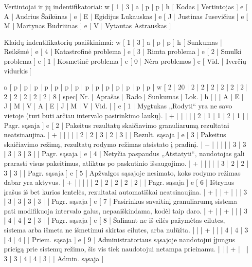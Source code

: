 Vertintojai ir jų indentifikatoriai:
\xtableu
{
  w [ 1 | 3 ]
  a [ p | p ]
  h [ Kodas | Vertintojas ]
  e [ A | Audrius Šaikūnas ]
  e [ E | Egidijus Lukauskas ]
  e [ J | Justinas Jusevičius ]
  e [ M | Martynas Budriūnas ]
  e [ V | Vytautas Astrauskas ]
}

Klaidų indentifikatorių paaiškinimai:
\xtableu
{
  w [ 1 | 3 ]
  a [ p | p ]
  h [ Sunkumas | Reikšmė ]
  e [ 4 | Katastrofinė problema ]
  e [ 3 | Rimta problema ]
  e [ 2 | Smulki problema ]
  e [ 1 | Kosmetinė problema ]
  e [ 0 | Nėra problemos ]
  e [ Vid. | Įverčių vidurkis ]
}

\xtableu
{
  a [ p   | p       | p | p | p | p | p | p | p | p | p | p | p    | p    ]
  w [ 2   | 20      | 2 | 2 | 2 | 2 | 2 | 2 | 2 | 2 | 2 | 2 | 2    | 8    ]
spec[ Nr. | Aprašas | Rado              | Sunkumas                 | Lok. ]
  h [     |         | A | E | J | M | V | A | E | J | M | V | Vid. |      ]
  e [ 1   | Mygtukas „Rodyti“ yra ne savo vietoje (turi būti arčiau intervalo
  pasirinkimo laukų).
                    | + |   |   |   |   | 2 | 1 | 1 | 2 | 1 |      | Pagr. sąsaja ]
  e [ 2   | Pakeitus rezultatų skaičiavimo granuliarumą rezultatai neatsinaujina.
                    | + |   |   |   |   | 2 | 2 | 3 | 2 | 3 |      | Rezult. sąsaja ]
  e [ 3   | Pakeitus skaičiavimo režimą, rezultatų rodymo režimas atsistato
  į pradinį.
                    | + |   |   |   |   | 3 | 3 | 3 | 3 | 3 |      | Pagr. sąsaja ]
  e [ 4   | Netyčia paspaudus „Atstatyti“, naudotojas gali prarasti visus pakeitimus,
  atliktus po paskutinio išsaugojimo.
                    | + |   |   |   |   | 3 | 2 | 2 | 3 | 3 |      | Pagr. sąsaja ]
  e [ 5   | Apžvalgos sąsajoje nesimato, koks rodymo režimas dabar yra aktyvus.
                    | + |   |   |   |   | 2 | 2 | 2 | 2 | 2 |      | Pagr. sąsaja ]
  e [ 6   | Ištrynus įrašus iš bet kurios lentelės, rezultatai automatiškai neatsinaujina.
                    | + |   | + |   |   | 3 | 3 | 3 | 3 | 3 |      | Pagr. sąsaja ]
  e [ 7   | Pasirinkus savaitinį granuliarumą sistema pati modifikuoja intervalo galus,
  nepaaiškindama, kodėl taip daro.
                    | + |   | + |   |   | 3 | 4 | 4 | 2 | 3 |      | Pagr. sąsaja ]
  e [ 8   | Šalinant ne iš eilės pažymėtas eilutes, sistema arba išmeta ne išmetimui
  skirtas eilutes, arba nulūžta.
                    |   |   | + |   |   | 4 | 4 | 3 | 4 | 4 |      | Priem. sąsaja ]
  e [ 9   | Administratoriaus sąsajoje naudotojui įjungus prieigą prie sistemų
  režimo, šis vis tiek naudotojui netampa prieinamu.
                    |   |   | + |   |   | 3 | 3 | 4 | 4 | 3 |      | Admin. sąsaja ]
}

